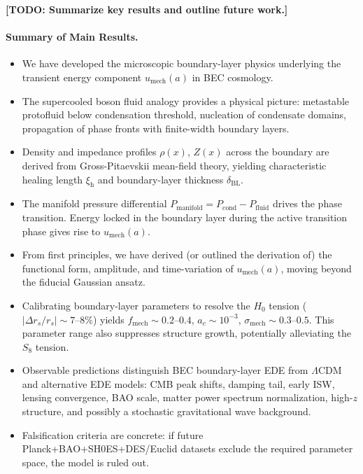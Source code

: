 \documentclass[11pt,a4paper]{article}
\newcommand{\umech}{\ensuremath{u_{\mathrm{mech}}}}
\newcommand{\fmech}{\ensuremath{f_{\mathrm{mech}}}}
\newcommand{\ac}{\ensuremath{a_c}}
\newcommand{\sigmamech}{\ensuremath{\sigma_{\mathrm{mech}}}}
\newcommand{\rs}{\ensuremath{r_s}}
\newcommand{\Pmanifold}{\ensuremath{P_{\mathrm{manifold}}}}
\newcommand{\Pfluid}{\ensuremath{P_{\mathrm{fluid}}}}
\newcommand{\Pcond}{\ensuremath{P_{\mathrm{cond}}}}
\newcommand{\xih}{\ensuremath{\xi_{\mathrm{h}}}}
\newcommand{\deltaBL}{\ensuremath{\delta_{\mathrm{BL}}}}
\theoremstyle{definition}
\theoremstyle{remark}
\begin{document}
\textbf{[TODO: Summarize key results and outline future work.]}

\paragraph{Summary of Main Results.}
\begin{itemize}[leftmargin=*, itemsep=0.3em]
\item We have developed the microscopic boundary-layer physics underlying the transient energy component $\umech(a)$ in BEC cosmology.
\item The supercooled boson fluid analogy provides a physical picture: metastable protofluid below condensation threshold, nucleation of condensate domains, propagation of phase fronts with finite-width boundary layers.
\item Density and impedance profiles $\rho(x)$, $Z(x)$ across the boundary are derived from Gross-Pitaevskii mean-field theory, yielding characteristic healing length $\xih$ and boundary-layer thickness $\deltaBL$.
\item The manifold pressure differential $\Pmanifold = \Pcond - \Pfluid$ drives the phase transition. Energy locked in the boundary layer during the active transition phase gives rise to $\umech(a)$.
\item From first principles, we have derived (or outlined the derivation of) the functional form, amplitude, and time-variation of $\umech(a)$, moving beyond the fiducial Gaussian ansatz.
\item Calibrating boundary-layer parameters to resolve the $H_0$ tension ($|\Delta\rs/\rs| \sim 7$--$8\%$) yields $\fmech \sim 0.2$--$0.4$, $\ac \sim 10^{-3}$, $\sigmamech \sim 0.3$--$0.5$. This parameter range also suppresses structure growth, potentially alleviating the $S_8$ tension.
\item Observable predictions distinguish BEC boundary-layer EDE from $\Lambda$CDM and alternative EDE models: CMB peak shifts, damping tail, early ISW, lensing convergence, BAO scale, matter power spectrum normalization, high-$z$ structure, and possibly a stochastic gravitational wave background.
\item Falsification criteria are concrete: if future Planck+BAO+SH0ES+DES/Euclid datasets exclude the required parameter space, the model is ruled out.
\end{itemize}
\end{document}
